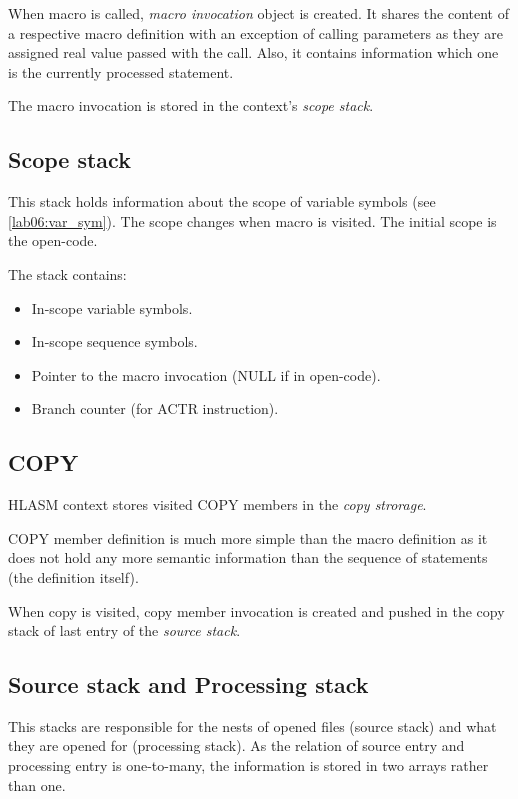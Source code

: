 When macro is called, \emph{macro invocation} object is created. It shares the content of a respective macro definition with an exception of calling parameters as they are assigned real value passed with the call. Also, it contains information which one is the currently processed statement.

The macro invocation is stored in the context's \emph{scope stack}.

\subsection{Scope stack}

This stack holds information about the scope of variable symbols (see \cref{lab06:var_sym}). The scope changes when macro is visited. The initial scope is the open-code. 


The stack contains:
\begin{itemize}
	\item In-scope variable symbols.
	\item In-scope sequence symbols.
	\item Pointer to the macro invocation (NULL if in open-code).
	\item Branch counter (for ACTR instruction).
\end{itemize}

\subsection{COPY}

HLASM context stores visited COPY members in the \emph{copy strorage}.

COPY member definition is much more simple than the macro definition as it does not hold any more semantic information than the sequence of statements (the definition itself).

When copy is visited, copy member invocation is created and pushed in the copy stack of last entry of the \emph{source stack}.

\subsection{Source stack and Processing stack}

This stacks are responsible for the nests of opened files (source stack) and what they are opened for (processing stack). As the relation of source entry and processing entry is one-to-many, the information is stored in two arrays rather than one.

